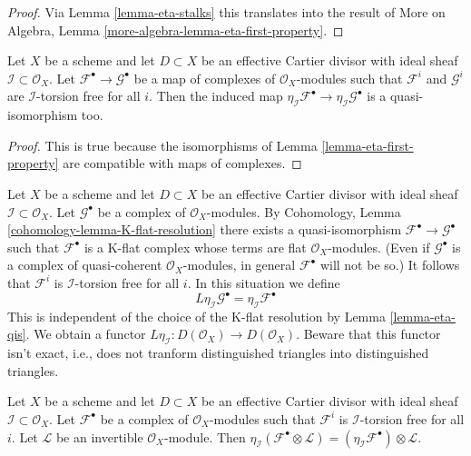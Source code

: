 \begin{proof}
Via Lemma \ref{lemma-eta-stalks} this translates into the result of
More on Algebra, Lemma \ref{more-algebra-lemma-eta-first-property}.
\end{proof}

\begin{lemma}
\label{lemma-eta-qis}
Let $X$ be a scheme and let $D \subset X$ be an effective Cartier divisor
with ideal sheaf $\mathcal{I} \subset \mathcal{O}_X$.
Let $\mathcal{F}^\bullet \to \mathcal{G}^\bullet$ be a map of complexes
of $\mathcal{O}_X$-modules such that $\mathcal{F}^i$ and $\mathcal{G}^i$
are $\mathcal{I}$-torsion free for all $i$.
Then the induced map
$\eta_\mathcal{I}\mathcal{F}^\bullet \to \eta_\mathcal{I}\mathcal{G}^\bullet$
is a quasi-isomorphism too.
\end{lemma}

\begin{proof}
This is true because the isomorphisms of Lemma \ref{lemma-eta-first-property}
are compatible with maps of complexes.
\end{proof}

\begin{remark}
\label{remark-Leta}
Let $X$ be a scheme and let $D \subset X$ be an effective Cartier divisor
with ideal sheaf $\mathcal{I} \subset \mathcal{O}_X$.
Let $\mathcal{G}^\bullet$ be a complex of $\mathcal{O}_X$-modules.
By Cohomology, Lemma \ref{cohomology-lemma-K-flat-resolution}
there exists a quasi-isomorphism $\mathcal{F}^\bullet \to \mathcal{G}^\bullet$
such that $\mathcal{F}^\bullet$ is a K-flat complex whose terms are flat
$\mathcal{O}_X$-modules. (Even if $\mathcal{G}^\bullet$ is a
complex of quasi-coherent $\mathcal{O}_X$-modules, in general
$\mathcal{F}^\bullet$ will not be so.)
It follows that $\mathcal{F}^i$ is
$\mathcal{I}$-torsion free for all $i$. In this situation we define
$$
L\eta_\mathcal{I} \mathcal{G}^\bullet = \eta_\mathcal{I} \mathcal{F}^\bullet
$$
This is independent of the choice of the K-flat resolution
by Lemma \ref{lemma-eta-qis}. We obtain a functor
$L\eta_\mathcal{I} : D(\mathcal{O}_X) \to D(\mathcal{O}_X)$.
Beware that this functor isn't exact, i.e.,
does not tranform distinguished triangles into distinguished triangles.
\end{remark}

\begin{lemma}
\label{lemma-eta-tensor-invertible}
Let $X$ be a scheme and let $D \subset X$ be an effective Cartier divisor
with ideal sheaf $\mathcal{I} \subset \mathcal{O}_X$.
Let $\mathcal{F}^\bullet$ be a complex of $\mathcal{O}_X$-modules
such that $\mathcal{F}^i$ is $\mathcal{I}$-torsion free for all $i$.
Let $\mathcal{L}$ be an invertible $\mathcal{O}_X$-module.
Then $\eta_\mathcal{I}(\mathcal{F}^\bullet \otimes \mathcal{L}) =
(\eta_\mathcal{I}\mathcal{F}^\bullet) \otimes \mathcal{L}$.
\end{lemma}

